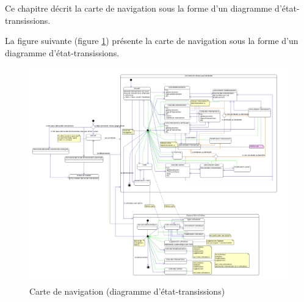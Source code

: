 Ce chapitre décrit la carte de navigation sous la forme d'un diagramme d'état-transissions.

La figure suivante (figure \ref{diagrammeEtatTrans}) présente la carte de navigation sous la forme d'un diagramme d'état-transissions.
\begin{figure}[H]
	\centering
	\includegraphics[scale=0.20]{images/diagrammeEtatsTransitions/carteDeNavigation.png}
	\caption{Carte de navigation (diagramme d'état-transissions)}
	\label{diagrammeEtatTrans}
\end{figure}
